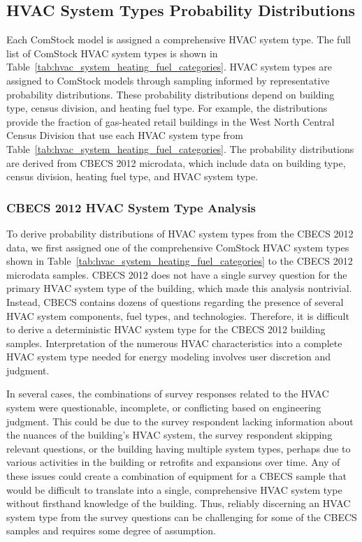 
\vspace{5mm}
\subsection{HVAC System Types Probability Distributions}
\label{sec:HVAC_System_Type}

Each ComStock model is assigned a comprehensive HVAC system type. The full list of ComStock HVAC system types is shown in Table~\ref{tab:hvac_system_heating_fuel_categories}. HVAC system types are assigned to ComStock models through sampling informed by representative probability distributions. These probability distributions depend on building type, census division, and heating fuel type. For example, the distributions provide the fraction of gas-heated retail buildings in the West North Central Census Division that use each HVAC system type from Table~\ref{tab:hvac_system_heating_fuel_categories}. The probability distributions are derived from CBECS 2012 microdata, which include data on building type, census division, heating fuel type, and HVAC system type.



\subsubsection{CBECS 2012 HVAC System Type Analysis}

To derive probability distributions of HVAC system types from the CBECS 2012 data, we first assigned one of the comprehensive ComStock HVAC system types shown in Table~\ref{tab:hvac_system_heating_fuel_categories} to the CBECS 2012 microdata samples. CBECS 2012 does not have a single survey question for the primary HVAC system type of the building, which made this analysis nontrivial. Instead, CBECS contains dozens of questions regarding the presence of several HVAC system components, fuel types, and technologies. Therefore, it is difficult to derive a deterministic HVAC system type for the CBECS 2012 building samples. Interpretation of the numerous HVAC characteristics into a complete HVAC system type needed for energy modeling involves user discretion and judgment. 

In several cases, the combinations of survey responses related to the HVAC system were questionable, incomplete, or conflicting based on engineering judgment. This could be due to the survey respondent lacking information about the nuances of the building's HVAC system, the survey respondent skipping relevant questions, or the building having multiple system types, perhaps due to various activities in the building or retrofits and expansions over time. Any of these issues could create a combination of equipment for a CBECS sample that would be difficult to translate into a single, comprehensive HVAC system type without firsthand knowledge of the building. Thus, reliably discerning an HVAC system type from the survey questions can be challenging for some of the CBECS samples and requires some degree of assumption.

